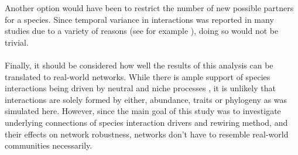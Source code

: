 \documentclass[12pt,a4paper]{article}
\begin{document}
Another option would have been to restrict the number of new possible partners for a species. Since temporal variance in interactions was reported in many studies due to a variety of reasons (see for example \cite{Olesen2008, CaraDonna2017, Schwarz2021}), doing so would not be trivial.
\paragraph{}

%



Finally, it should be considered how well the results of this analysis can be translated to real-world networks. While there is ample support of species interactions being driven by neutral and niche processes \parencite{Jordano2003, Rezende2007, Vazquez2007, Bluethgen2008}, it is unlikely that interactions are solely formed by either, abundance, traits or phylogeny as was simulated here. However, since the main goal of this study was to investigate underlying
connections of species interaction drivers and rewiring method, and their effects on network robustness, networks don't have to resemble real-world communities necessarily.  

\end{document}
